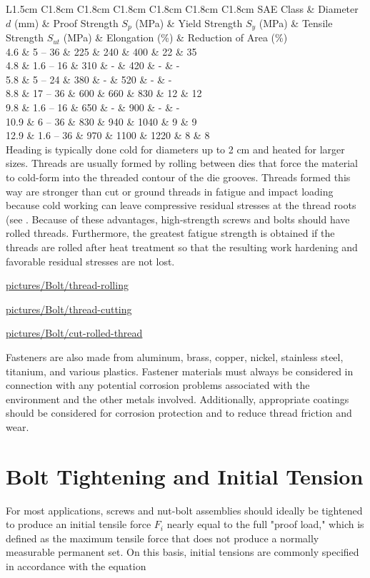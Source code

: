 \documentclass[a4paper,openany,12pt]{book}
\begin{document}
{{ L1.5cm C1.8cm C1.8cm C1.8cm C1.8cm C1.8cm C1.8cm SAE Class \& Diameter
\(d\) (mm) \& Proof Strength \(S_p\) (MPa) \& Yield Strength \(S_y\) (MPa) \&
Tensile Strength \(S_{ut}\) (MPa) \& Elongation (\%) \& Reduction of Area
(\%)\\
4.6 \& 5 -- 36 \& 225 \& 240 \& 400 \& 22 \& 35\\
4.8 \& 1.6 -- 16 \& 310 \& - \& 420 \& - \& -\\
5.8 \& 5 -- 24 \& 380 \& - \& 520 \& - \& -\\
8.8 \& 17 -- 36 \& 600 \& 660 \& 830 \& 12 \& 12\\
9.8 \& 1.6 -- 16 \& 650 \& - \& 900 \& - \& -\\
10.9 \& 6 -- 36 \& 830 \& 940 \& 1040 \& 9 \& 9\\
12.9 \& 1.6 -- 36 \& 970 \& 1100 \& 1220 \& 8 \& 8\\

Heading is typically done cold for diameters up to 2 cm and heated for
larger sizes. Threads are usually formed by rolling between dies that
force the material to cold-form into the threaded contour of the die
grooves. Threads formed this way are stronger than cut or ground threads
in fatigue and impact loading because cold working can leave compressive
residual stresses at the thread roots (see . Because of these
advantages, high-strength screws and bolts should have rolled threads.
Furthermore, the greatest fatigue strength is obtained if the threads
are rolled after heat treatment so that the resulting work hardening and
favorable residual stresses are not lost.


\url{pictures/Bolt/thread-rolling}


\url{pictures/Bolt/thread-cutting}


\url{pictures/Bolt/cut-rolled-thread}

Fasteners are also made from aluminum, brass, copper, nickel, stainless
steel, titanium, and various plastics. Fastener materials must always be
considered in connection with any potential corrosion problems
associated with the environment and the other metals involved.
Additionally, appropriate coatings should be considered for corrosion
protection and to reduce thread friction and wear.

\section{Bolt Tightening and Initial Tension}
\label{sec:orgf16632b}
For most applications, screws and nut-bolt assemblies should ideally be
tightened to produce an initial tensile force \(F_i\) nearly equal to the
full "proof load," which is defined as the maximum tensile force that
does not produce a normally measurable permanent set. On this basis,
initial tensions are commonly specified in accordance with the equation

}}
\end{document}
